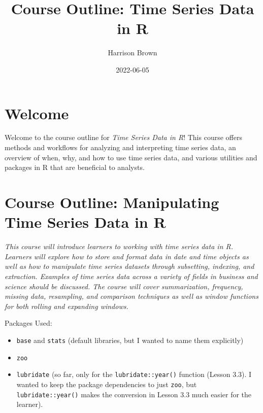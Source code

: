 \documentclass[
]{book}
\title{Course Outline: Time Series Data in R}
\author{Harrison Brown}
\date{2022-06-05}
\providecommand{\tightlist}{%
  \setlength{\itemsep}{0pt}\setlength{\parskip}{0pt}}
\begin{document}
\maketitle

{
\setcounter{tocdepth}{1}
\tableofcontents
}
\hypertarget{welcome}{%
\chapter*{Welcome}\label{welcome}}

Welcome to the course outline for \emph{Time Series Data in R}! This course offers methods and workflows for analyzing and interpreting time series data, an overview of when, why, and how to use time series data, and various utilities and packages in R that are beneficial to analysts.

\hypertarget{course-outline-manipulating-time-series-data-in-r}{%
\chapter*{Course Outline: Manipulating Time Series Data in R}\label{course-outline-manipulating-time-series-data-in-r}}

\emph{This course will introduce learners to working with time series data in R. Learners will explore how to store and format data in date and time objects as well as how to manipulate time series datasets through subsetting, indexing, and extraction. Examples of time series data across a variety of fields in business and science should be discussed. The course will cover summarization, frequency, missing data, resampling, and comparison techniques as well as window functions for both rolling and expanding windows.}

Packages Used:

\begin{itemize}
\tightlist
\item
  \texttt{base} and \texttt{stats} (default libraries, but I wanted to name them explicitly)
\item
  \texttt{zoo}
\item
  \texttt{lubridate} (so far, only for the \texttt{lubridate::year()} function (Lesson 3.3). I wanted to keep the package dependencies to just \texttt{zoo}, but \texttt{lubridate::year()} makes the conversion in Lesson 3.3 much easier for the learner).
\end{itemize}
\end{document}
